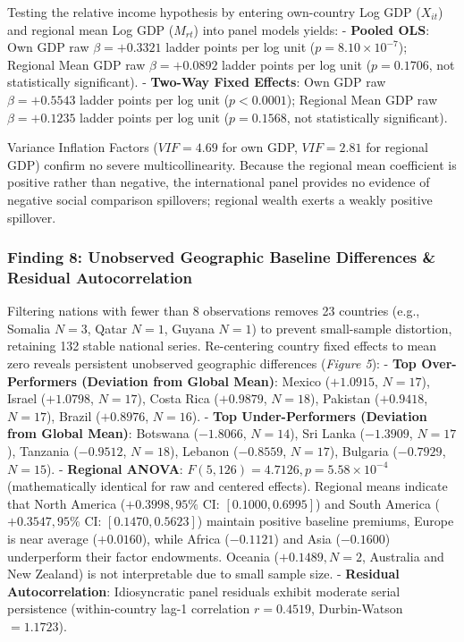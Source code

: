 \documentclass[
]{article}
\begin{document}
Testing the relative income hypothesis by entering own-country Log GDP
(\(X_{it}\)) and regional mean Log GDP (\(M_{rt}\)) into panel models
yields: - \textbf{Pooled OLS}: Own GDP raw \(\beta = +0.3321\) ladder
points per log unit (\(p = 8.10 \times 10^{-7}\)); Regional Mean GDP raw
\(\beta = +0.0892\) ladder points per log unit (\(p = 0.1706\), not
statistically significant). - \textbf{Two-Way Fixed Effects}: Own GDP
raw \(\beta = +0.5543\) ladder points per log unit (\(p < 0.0001\));
Regional Mean GDP raw \(\beta = +0.1235\) ladder points per log unit
(\(p = 0.1568\), not statistically significant).

Variance Inflation Factors (\(VIF = 4.69\) for own GDP, \(VIF = 2.81\)
for regional GDP) confirm no severe multicollinearity. Because the
regional mean coefficient is positive rather than negative, the
international panel provides no evidence of negative social comparison
spillovers; regional wealth exerts a weakly positive spillover.

\hypertarget{finding-8-unobserved-geographic-baseline-differences-residual-autocorrelation}{%
\subsubsection{Finding 8: Unobserved Geographic Baseline Differences \&
Residual
Autocorrelation}\label{finding-8-unobserved-geographic-baseline-differences-residual-autocorrelation}}

Filtering nations with fewer than 8 observations removes 23 countries
(e.g., Somalia \(N=3\), Qatar \(N=1\), Guyana \(N=1\)) to prevent
small-sample distortion, retaining 132 stable national series.
Re-centering country fixed effects to mean zero reveals persistent
unobserved geographic differences (\emph{Figure 5}): - \textbf{Top
Over-Performers (Deviation from Global Mean)}: Mexico (\(+1.0915\),
\(N=17\)), Israel (\(+1.0798\), \(N=17\)), Costa Rica (\(+0.9879\),
\(N=18\)), Pakistan (\(+0.9418\), \(N=17\)), Brazil (\(+0.8976\),
\(N=16\)). - \textbf{Top Under-Performers (Deviation from Global Mean)}:
Botswana (\(-1.8066\), \(N=14\)), Sri Lanka (\(-1.3909\), \(N=17\)),
Tanzania (\(-0.9512\), \(N=18\)), Lebanon (\(-0.8559\), \(N=17\)),
Bulgaria (\(-0.7929\), \(N=15\)). - \textbf{Regional ANOVA}:
\(F(5, 126) = 4.7126, p = 5.58 \times 10^{-4}\) (mathematically
identical for raw and centered effects). Regional means indicate that
North America (\(+0.3998, 95\% \text{ CI: } [0.1000, 0.6995]\)) and
South America (\(+0.3547, 95\% \text{ CI: } [0.1470, 0.5623]\)) maintain
positive baseline premiums, Europe is near average (\(+0.0160\)), while
Africa (\(-0.1121\)) and Asia (\(-0.1600\)) underperform their factor
endowments. Oceania (\(+0.1489, N=2\), Australia and New Zealand) is not
interpretable due to small sample size. - \textbf{Residual
Autocorrelation}: Idiosyncratic panel residuals exhibit moderate serial
persistence (within-country lag-1 correlation \(r = 0.4519\),
Durbin-Watson \(= 1.1723\)).
\end{document}
